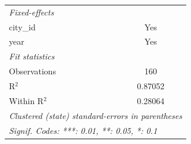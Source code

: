 \begin{tabular}{lc}
   \midrule
   \emph{Fixed-effects}\\
   city\_id            & Yes\\  
   year                & Yes\\  
   \midrule
   \emph{Fit statistics}\\
   Observations        & 160\\  
   R$^2$               & 0.87052\\  
   Within R$^2$        & 0.28064\\  
   \midrule \midrule
   \multicolumn{2}{l}{\emph{Clustered (state) standard-errors in parentheses}}\\
   \multicolumn{2}{l}{\emph{Signif. Codes: ***: 0.01, **: 0.05, *: 0.1}}\\
\end{tabular}
\par\endgroup


